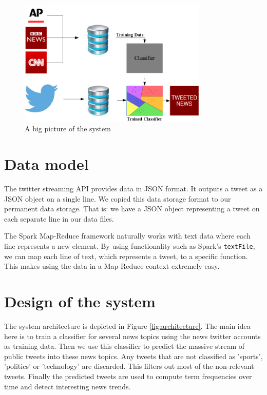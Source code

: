 \documentclass{llncs}
\begin{document}
\begin{figure}[H]
	\centering
	\includegraphics[width=0.8\textwidth]{images/bigpicture.png} 
	\caption{A big picture of the system}
	\label{fig:A big picture of the system}
\end{figure}



\section{Data model}
The twitter streaming API provides data in JSON format. It outputs a tweet as a JSON object on a single line. We copied this data storage format to our permanent data storage. That is: we have a JSON object representing a tweet on each separate line in our data files.

The Spark Map-Reduce framework naturally works with text data where each line represents a new element. By using functionality such as Spark's \texttt{textFile}, we can map each line of text, which represents a tweet, to a specific function. This makes using the data in a Map-Reduce context extremely easy.

\section{Design of the system}
The system architecture is depicted in Figure \ref{fig:architecture}. The main idea here is to train a classifier for several news topics using the news twitter accounts as training data. Then we use this classifier to predict the massive stream of public tweets into these news topics. Any tweets that are not classified as 'sports', 'politics' or 'technology' are discarded. This filters out most of the non-relevant tweets. Finally the predicted tweets are used to compute term frequencies over time and detect interesting news trends.
\end{document}

